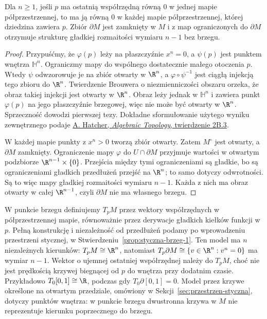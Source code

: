 \begin{stwierdzenie}
\label{prop:brzeg-niezalezny-1}
Dla $n\geq1$, jeśli $p$ ma ostatnią współrzędną równą $0$ w jednej
mapie półprzestrzennej, to ma ją równą $0$ w każdej
mapie półprzestrzennej, której dziedzina zawiera $p$.
Zbiór $\partial M$ jest zamknięty w $M$ i z map ograniczonych
do $\partial M$ otrzymuje strukturę gładkiej
rozmaitości wymiaru $n-1$ bez brzegu.
\end{stwierdzenie}
\begin{proof}
Przypuśćmy, że $\varphi(p)$ leży na płaszczyźnie
$x^n=0$, a $\psi(p)$ jest punktem wnętrza $\mathbb H^n$.
Ograniczmy mapy do wspólnego dostatecznie małego otoczenia
$p$. Wtedy $\psi$ odwzorowuje je na zbiór otwarty w $\R^n$,
a $\varphi\circ\psi^{-1}$ jest ciągłą injekcją tego zbioru
do $\R^n$. Twierdzenie Brouwera o niezmienniczości obszaru
orzeka, że obraz takiej injekcji jest otwarty w $\R^n$.
Obraz leży jednak w $\mathbb H^n$ i zawiera punkt
$\varphi(p)$ na jego płaszczyźnie brzegowej, więc nie może
być otwarty w $\R^n$. Sprzeczność dowodzi pierwszej tezy.
Dokładne sformułowanie użytego wyniku zewnętrznego podaje
\href{https://pi.math.cornell.edu/~hatcher/AT/AT.pdf}
{A. Hatcher, \emph{Algebraic Topology}, twierdzenie 2B.3}.

W każdej mapie punkty z $x^n>0$ tworzą zbiór otwarty.
Zatem $M^\circ$ jest otwarty, a $\partial M$ zamknięty.
Ograniczenie mapy $\varphi$ do
$U\cap\partial M$ przyjmuje wartości w otwartym
podzbiorze $\R^{n-1}\times\{0\}$. Przejścia między
tymi ograniczeniami są gładkie, bo są ograniczeniami
gładkich przedłużeń przejść na $\R^n$; to samo dotyczy
odwrotności. Są to więc mapy gładkiej rozmaitości
wymiaru $n-1$. Każda z nich ma obraz otwarty w całej
$\R^{n-1}$, czyli $\partial M$ nie ma własnego brzegu.
\end{proof}

W punkcie brzegu definiujemy $T_pM$ przez
wektory współrzędnych w półprzestrzennej mapie,
równoważnie przez derywacje gładkich kiełków
funkcji w $p$. Pełną konstrukcję i niezależność od przedłużeń
podamy po wprowadzeniu przestrzeni stycznej, w
Stwierdzeniu~\ref{prop:styczna-brzeg-1}. Ten model ma $n$ niezależnych
kierunków: $T_pM\cong\R^n$, natomiast
$T_p\partial M\cong\{v\in\R^n:v^n=0\}$ ma wymiar $n-1$.
Wektor o ujemnej ostatniej współrzędnej należy do $T_pM$,
choć nie jest prędkością krzywej biegnącej od $p$ do wnętrza
przy dodatnim czasie. Przykładowo $T_0[0,1]\cong\R$,
podczas gdy $T_0\partial[0,1]=0$.
Model przez krzywe określone na otwartym przedziale,
omówiony w Sekcji~\ref{sec:przestrzen-styczna},
dotyczy punktów wnętrza: w punkcie brzegu
dwustronna krzywa w $M$ nie reprezentuje
kierunku poprzecznego do brzegu.

